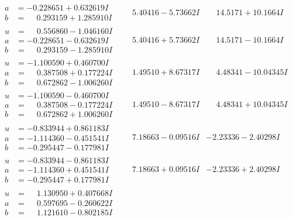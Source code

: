 \documentclass[1p]{elsarticle_modified}
\theoremstyle{definition}
\begin{document}
$$\begin{array}{c|c|c}
\begin{aligned}
a &= -0.228651 + 0.632619 I \\
b &= \phantom{-}0.293159 + 1.285910 I\end{aligned}
 & \phantom{-}5.40416 - 5.73662 I & \phantom{-}14.5171 + 10.1664 I \\ \hline\begin{aligned}
u &= \phantom{-}0.556860 - 1.046160 I \\
a &= -0.228651 - 0.632619 I \\
b &= \phantom{-}0.293159 - 1.285910 I\end{aligned}
 & \phantom{-}5.40416 + 5.73662 I & \phantom{-}14.5171 - 10.1664 I \\ \hline\begin{aligned}
u &= -1.100590 + 0.460700 I \\
a &= \phantom{-}0.387508 + 0.177224 I \\
b &= \phantom{-}0.672862 - 1.006260 I\end{aligned}
 & \phantom{-}1.49510 + 8.67317 I & \phantom{-}4.48341 - 10.04345 I \\ \hline\begin{aligned}
u &= -1.100590 - 0.460700 I \\
a &= \phantom{-}0.387508 - 0.177224 I \\
b &= \phantom{-}0.672862 + 1.006260 I\end{aligned}
 & \phantom{-}1.49510 - 8.67317 I & \phantom{-}4.48341 + 10.04345 I \\ \hline\begin{aligned}
u &= -0.833944 + 0.861183 I \\
a &= -1.114360 - 0.451541 I \\
b &= -0.295447 - 0.177981 I\end{aligned}
 & \phantom{-}7.18663 - 0.09516 I & -2.23336 - 2.40298 I \\ \hline\begin{aligned}
u &= -0.833944 - 0.861183 I \\
a &= -1.114360 + 0.451541 I \\
b &= -0.295447 + 0.177981 I\end{aligned}
 & \phantom{-}7.18663 + 0.09516 I & -2.23336 + 2.40298 I \\ \hline\begin{aligned}
u &= \phantom{-}1.130950 + 0.407668 I \\
a &= \phantom{-}0.597695 - 0.260622 I \\
b &= \phantom{-}1.121610 - 0.802185 I\end{aligned}

\end{array}$$
\end{document}
